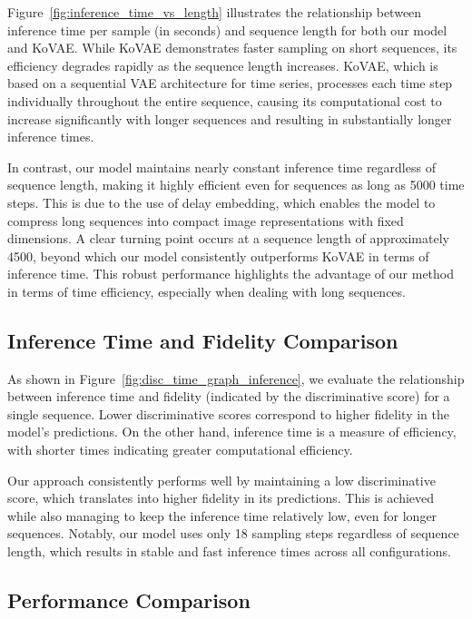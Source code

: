 \documentclass{article}
\theoremstyle{plain}
\theoremstyle{definition}
\theoremstyle{remark}
\begin{document}
{Figure~\ref{fig:inference_time_vs_length} illustrates the relationship between inference time per sample (in seconds) and sequence length for both our model and KoVAE. While KoVAE demonstrates faster sampling on short sequences, its efficiency degrades rapidly as the sequence length increases. KoVAE, which is based on a sequential VAE architecture for time series, processes each time step individually throughout the entire sequence, causing its computational cost to increase significantly with longer sequences and resulting in substantially longer inference times.}

In contrast, our model maintains nearly constant inference time regardless of sequence length, making it highly efficient even for sequences as long as 5000 time steps. This is due to the use of delay embedding, which enables the model to compress long sequences into compact image representations with fixed dimensions. A clear turning point occurs at a sequence length of approximately 4500, beyond which our model consistently outperforms KoVAE in terms of inference time. This robust performance highlights the advantage of our method in terms of time efficiency, especially when dealing with long sequences.

\subsection{Inference Time and Fidelity Comparison}

As shown in Figure~\ref{fig:disc_time_graph_inference}, we evaluate the relationship between inference time and fidelity (indicated by the discriminative score) for a single sequence. Lower discriminative scores correspond to higher fidelity in the model’s predictions. On the other hand, inference time is a measure of efficiency, with shorter times indicating greater computational efficiency.

Our approach consistently performs well by maintaining a low discriminative score, which translates into higher fidelity in its predictions. This is achieved while also managing to keep the inference time relatively low, even for longer sequences. Notably, our model uses only 18 sampling steps regardless of sequence length, which results in stable and fast inference times across all configurations.

\subsection{Performance Comparison}
\end{document}
